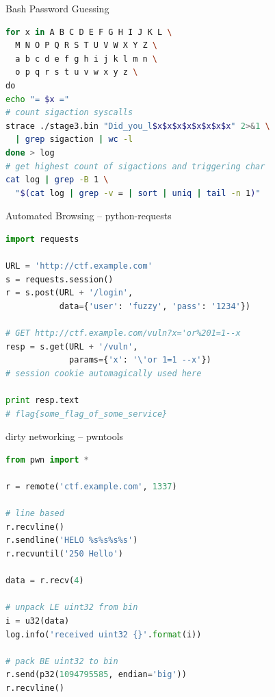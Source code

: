 \begin{frame}[fragile]
  {Bash Password Guessing}

  \begin{lstlisting}[language=bash]
for x in A B C D E F G H I J K L \
  M N O P Q R S T U V W X Y Z \
  a b c d e f g h i j k l m n \
  o p q r s t u v w x y z \
do
echo "= $x ="
# count sigaction syscalls
strace ./stage3.bin "Did_you_l$x$x$x$x$x$x$x$x" 2>&1 \
  | grep sigaction | wc -l
done > log
# get highest count of sigactions and triggering char
cat log | grep -B 1 \
  "$(cat log | grep -v = | sort | uniq | tail -n 1)"
  \end{lstlisting}

\end{frame}



\begin{frame}[fragile]
  {Automated Browsing -- python-requests}

  \begin{lstlisting}[language=python]
import requests

URL = 'http://ctf.example.com'
s = requests.session()
r = s.post(URL + '/login',
           data={'user': 'fuzzy', 'pass': '1234'})

# GET http://ctf.example.com/vuln?x='or%201=1--x
resp = s.get(URL + '/vuln',
             params={'x': '\'or 1=1 --x'})
# session cookie automagically used here

print resp.text
# flag{some_flag_of_some_service}
  \end{lstlisting}
\end{frame}


\begin{frame}[fragile]
  {dirty networking -- pwntools}

  \begin{lstlisting}[language=python]
from pwn import *

r = remote('ctf.example.com', 1337)

# line based
r.recvline()
r.sendline('HELO %s%s%s%s')
r.recvuntil('250 Hello')

data = r.recv(4)

# unpack LE uint32 from bin
i = u32(data)
log.info('received uint32 {}'.format(i))

# pack BE uint32 to bin
r.send(p32(1094795585, endian='big'))
r.recvline()
  \end{lstlisting}
\end{frame}


